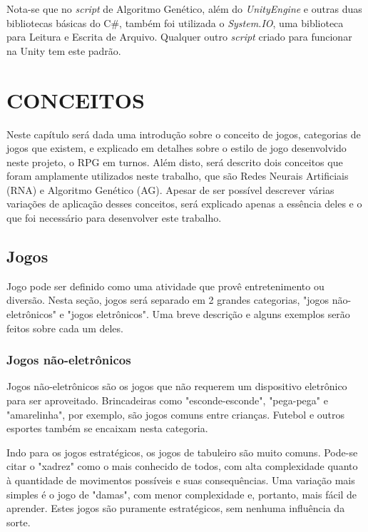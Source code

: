 \documentclass[
	12pt,					%
	openright,				%
	oneside,				%
	a4paper,				%
	bibjustif,				%
	chapter=TITLE,			%
	english,				%
	brazil,					%
	]{abntex2}
\begin{document}
		Nota-se que no \textit{script} de Algoritmo Genético, além do \textit{UnityEngine} e outras duas bibliotecas básicas do C\#,
		também foi utilizada o \textit{System.IO}, uma biblioteca para Leitura e Escrita de Arquivo.
		Qualquer outro \textit{script} criado para funcionar na Unity tem este padrão.

\FloatBarrier
\newpage %
\chapter{CONCEITOS}

	Neste capítulo será dada uma introdução sobre o conceito de jogos,
	categorias de jogos que existem,
	e explicado em detalhes sobre o estilo de jogo desenvolvido neste projeto,
	o RPG em turnos.
	Além disto, será descrito dois conceitos que foram amplamente utilizados neste trabalho,
	que são Redes Neurais Artificiais (RNA) e Algoritmo Genético (AG).
	Apesar de ser possível descrever várias variações de aplicação desses conceitos,
	será explicado apenas a essência deles e o que foi necessário para desenvolver este trabalho.
	
	\FloatBarrier
	\section{Jogos}
	Jogo pode ser definido como uma atividade que provê entretenimento ou diversão{}.
	Nesta seção, jogos será separado em 2 grandes categorias,
	"jogos não-eletrônicos"{} e "jogos eletrônicos"{}.
	Uma breve descrição e alguns exemplos serão feitos sobre cada um deles.
	
		\FloatBarrier
		\subsection{Jogos não-eletrônicos} \label{ssec:notElectronicGame}
		Jogos não-eletrônicos são os jogos que não requerem um dispositivo eletrônico para ser aproveitado.
		Brincadeiras como "esconde-esconde"{}, "pega-pega"{} e "amarelinha"{}, por exemplo,
		são jogos comuns entre crianças.
		Futebol e outros esportes também se encaixam nesta categoria.
		
		Indo para os jogos estratégicos,
		os jogos de tabuleiro são muito comuns.
		Pode-se citar o "xadrez"{} como o mais conhecido de todos,
		com alta complexidade quanto à quantidade de movimentos possíveis e suas consequências.
		Uma variação mais simples é o jogo de "damas"{},
		com menor complexidade e, portanto, mais fácil de aprender.
		Estes jogos são puramente estratégicos,
		sem nenhuma influência da sorte.
		
\end{document}
